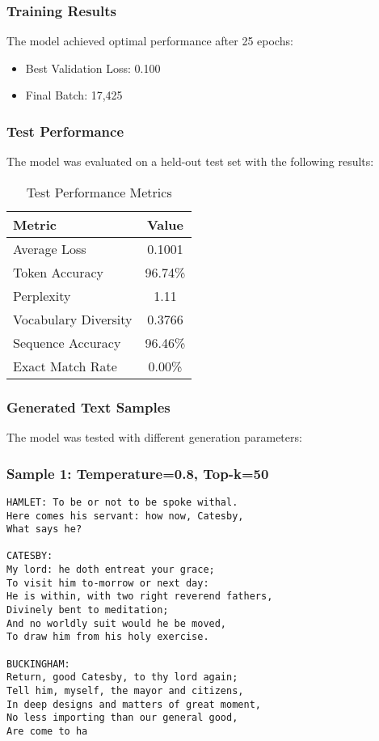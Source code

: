 \subsubsection*{Training Results}
The model achieved optimal performance after 25 epochs:
\begin{itemize}
    \item Best Validation Loss: 0.100
    \item Final Batch: 17,425
\end{itemize}

\subsubsection*{Test Performance}
The model was evaluated on a held-out test set with the following results:

\begin{table}[h]
\centering
\caption{Test Performance Metrics}
\label{tab:metrics_medium}
\begin{tabular}{lc}
\toprule
\textbf{Metric} & \textbf{Value} \\
\midrule
Average Loss & 0.1001 \\
Token Accuracy & 96.74\% \\
Perplexity & 1.11 \\
Vocabulary Diversity & 0.3766 \\
Sequence Accuracy & 96.46\% \\
Exact Match Rate & 0.00\% \\
\bottomrule
\end{tabular}
\end{table}

\subsubsection*{Generated Text Samples}
The model was tested with different generation parameters:

\subsubsection*{Sample 1: Temperature=0.8, Top-k=50}
\begin{verbatim}
HAMLET: To be or not to be spoke withal.
Here comes his servant: how now, Catesby,
What says he?

CATESBY:
My lord: he doth entreat your grace;
To visit him to-morrow or next day:
He is within, with two right reverend fathers,
Divinely bent to meditation;
And no worldly suit would he be moved,
To draw him from his holy exercise.

BUCKINGHAM:
Return, good Catesby, to thy lord again;
Tell him, myself, the mayor and citizens,
In deep designs and matters of great moment,
No less importing than our general good,
Are come to ha
\end{verbatim}

